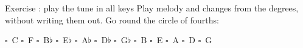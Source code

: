 \begin{study}{Exercise \theexercise: play the tune in all keys}
Play melody and changes from the degrees, without writing them out.
Go round the circle of fourths:

\smallskip
\noindent
$\square$~C \quad $\square$~F \quad $\square$~B$\flat$ \quad $\square$~E$\flat$ \quad
$\square$~A$\flat$ \quad $\square$~D$\flat$ \quad $\square$~G$\flat$ \quad
$\square$~B \quad $\square$~E \quad $\square$~A \quad $\square$~D \quad $\square$~G
\end{study}
